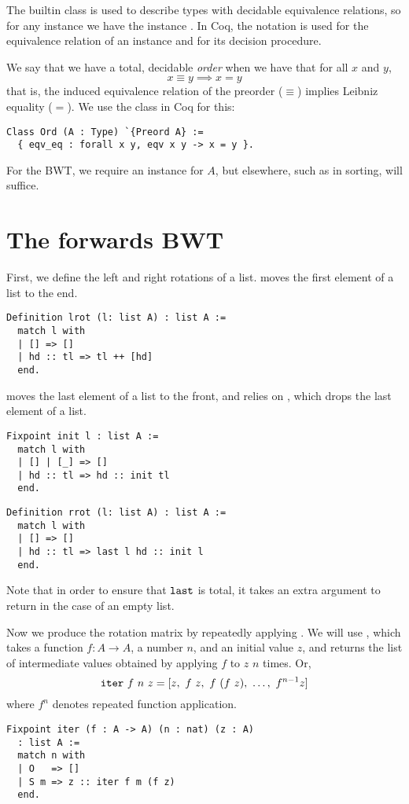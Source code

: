 \documentclass[sigplan,10pt,anonymous,review]{thesis}
\begin{document}
The builtin class  is used to describe types with decidable
equivalence relations, so for any  instance we have the
 instance . In Coq, the notation
\var{=\hspace{0pt}=\hspace{0pt}=} is used for the equivalence relation of an 
instance and \var{=\hspace{0pt}=} for its decision procedure.

We say that we have a total, decidable \textit{order} when we have
that for all $x$ and $y$,
\begin{equation*}
  x \equiv y \implies x = y
\end{equation*}
that is, the induced equivalence relation of the preorder ($\equiv$)
implies Leibniz equality ($=$). We use the  class in Coq
for this:
\begin{lstlisting}
Class Ord (A : Type) `{Preord A} :=
  { eqv_eq : forall x y, eqv x y -> x = y }.
\end{lstlisting}
For the BWT, we require an  instance for $A$, but
elsewhere, such as in sorting,  will suffice.

\section{The forwards BWT}
\label{sec:forwards_BWT}

First, we define the left and right rotations of a list. 
moves the first element of a list to the end.
\begin{lstlisting}
Definition lrot (l: list A) : list A :=
  match l with
  | [] => []
  | hd :: tl => tl ++ [hd]
  end.
\end{lstlisting}
 moves the last element of a list to the front, and
relies on , which drops the last element of a list.
\begin{lstlisting}
Fixpoint init l : list A :=
  match l with
  | [] | [_] => []
  | hd :: tl => hd :: init tl
  end.
\end{lstlisting}
\begin{lstlisting}
Definition rrot (l: list A) : list A :=
  match l with
  | [] => []
  | hd :: tl => last l hd :: init l
  end.
\end{lstlisting}
Note that in order to ensure that $\texttt{\textup{last}}$ is total, it takes
an extra argument to return in the case of an empty list.

Now we produce the rotation matrix by repeatedly applying .
We will use , which takes a function $f : A \to A$, a number
$n$, and an initial value $z$, and returns the list of intermediate
values obtained by applying $f$ to $z$ $n$ times. Or,
\begin{equation}
  \texttt{\textup{iter}}~f~n~z = [z,~f~z,~f~(f~z),~\ldots,~f^{n-1} z]
  \label{eq:iter}
\end{equation}
where $f^n$ denotes repeated function application.
\begin{lstlisting}
Fixpoint iter (f : A -> A) (n : nat) (z : A)
  : list A :=
  match n with
  | O   => []
  | S m => z :: iter f m (f z)
  end.
\end{lstlisting}
\end{document}

